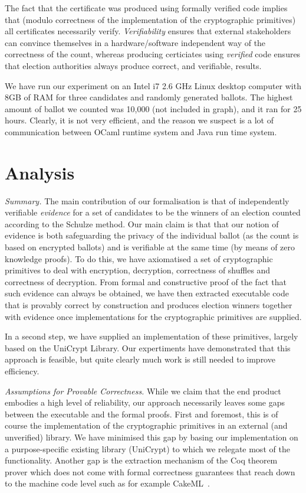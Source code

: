 \documentclass{llncs}
\begin{document}

The fact that the certificate was produced using formally verified
code implies that (modulo correctness of the implementation of the
cryptographic primitives) all certificates necessarily verify.
\emph{Verifiability} ensures that external stakeholders can convince
themselves in a hardware/software independent way of the correctness
of the count, whereas producing certiciates using \emph{verified}
code ensures that election authorities always produce correct, and
verifiable, results.


We have run our experiment on an  Intel  i7  2.6  GHz  Linux  desktop  computer
with  8GB  of  RAM for three candidates and randomly generated ballots. The 
highest amount of ballot we counted was 10,000 (not included in graph), and 
it ran for 25 hours. Clearly, it is not very efficient, and the reason we 
suspect is a lot of communication between OCaml runtime system 
and Java run time system.

\section{Analysis}

\noindent\emph{Summary.} The main contribution of our formalisation is that of independently
verifiable \emph{evidence} for a set of candidates to be the winners
of an election counted according to the Schulze method. Our main
claim is that that our notion of evidence is both safeguarding the
privacy of the individual ballot (as the count is based on encrypted
ballots) and is verifiable at the same time (by means of zero
knowledge proofs). To do this, we have axiomatised a set of
cryptographic primitives to deal with encryption, decryption,
correctness of shuffles and correctness of decryption. From formal
and constructive proof of the fact that such evidence can always be
obtained, we have then extracted executable code that is provably
correct by construction and produces election winners together with
evidence once implementations for the cryptographic primitives are
supplied.

In a second step, we have supplied an implementation of these
primitives, largely based on the UniCrypt Library. Our expertiments
have demonstrated that this approach is feasible, but quite clearly
much work is still needed to improve efficiency. 

\smallskip\noindent\emph{Assumptions for Provable Correctness.}
While we claim that the end product embodies a high level of
reliability, our approach necessarily leaves some gaps between the
executable and the formal proofs. First and foremost, this is of
course the implementation of the cryptographic primitives in an
external (and unverified) library. We have minimised this gap by
basing our implementation on a purpose-specific existing library
(UniCrypt) to which we relegate most of the functionality. Another
gap is the extraction mechanism of the Coq theorem prover which does
not come with formal correctness guarantees that reach down to the
machine code level such as for example CakeML~\cite{Kumar:2014:CVI}.
\end{document}

